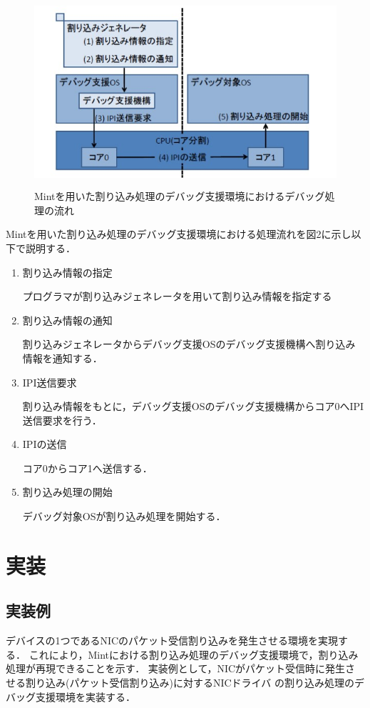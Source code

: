 \documentclass[12pt]{jsarticle}
\begin{document}
\begin{figure}[t]
\begin{center}
\includegraphics[height=7.0cm]{./fig1.jpg}          
\caption{Mintを用いた割り込み処理のデバッグ支援環境におけるデバッグ処理の流れ}
\label{fig:up}
\end{center}
\end{figure}




Mintを用いた割り込み処理のデバッグ支援環境における処理流れを図2に示し以下で説明する．
\begin{enumerate}
\item 割り込み情報の指定

プログラマが割り込みジェネレータを用いて割り込み情報を指定する
\item 割り込み情報の通知

割り込みジェネレータからデバッグ支援OSのデバッグ支援機構へ割り込み情報を通知する．
\item IPI送信要求

割り込み情報をもとに，デバッグ支援OSのデバッグ支援機構からコア0へIPI送信要求を行う．
\item IPIの送信

コア0からコア1へ送信する．
\item 割り込み処理の開始

デバッグ対象OSが割り込み処理を開始する．
\end{enumerate}
\section{実装}
\subsection{実装例}
デバイスの1つであるNICのパケット受信割り込みを発生させる環境を実現する．
これにより，Mintにおける割り込み処理のデバッグ支援環境で，割り込み処理が再現できることを示す．
実装例として，NICがパケット受信時に発生させる割り込み(パケット受信割り込み)に対するNICドライバ
の割り込み処理のデバッグ支援環境を実装する．
\end{document}
